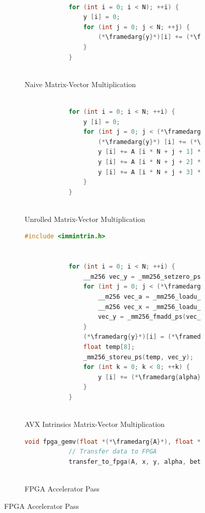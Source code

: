 \documentclass[manuscript,screen,review]{acmart}
\newcommand{\framedarg}[1]{
	\tikz[baseline=(char.base)]
	\node[draw=green, rectangle, inner sep=1.5pt, anchor=base] (char) {#1};
}
\begin{document}
	\begin{figure}[h]
	\centering
	\begin{subfigure}[t]{0.45\textwidth}
		\centering
		\caption{Naive Matrix-Vector Multiplication}
		\label{lst:naive}
		\begin{lstlisting}[language=C]
			
			for (int i = 0; i < N); ++i) {
				y [i] = 0;
				for (int j = 0; j < N; ++j) {
					(*\framedarg{y}*)[i] += (*\framedarg{A}*)[i * (*\framedarg{N}*) + j] * (*\framedarg{x}*)[j];
				}
			}
			
		\end{lstlisting}
	\end{subfigure}
	\hspace{1em}
	\begin{subfigure}[t]{0.45\textwidth}
		\centering
		\caption{Unrolled Matrix-Vector Multiplication}
		\label{lst:unrolled}
		\begin{lstlisting}[language=C]
			
			for (int i = 0; i < N; ++i) {
				y [i] = 0;
				for (int j = 0; j < (*\framedarg{N}*); j += 4) {
					(*\framedarg{y}*) [i] += (*\framedarg{A}*)[i * (*\framedarg{N}*) + j] * (*\framedarg{x}*)[j];
					y [i] += A [i * N + j + 1] * x [j + 1];
					y [i] += A [i * N + j + 2] * x [j + 2];
					y [i] += A [i * N + j + 3] * x [j + 3];
				}
			}
			
		\end{lstlisting}
	\end{subfigure}
	\vspace{1em}
	\begin{subfigure}[t]{0.45\textwidth}
		\centering
		\caption{AVX Intrinsics Matrix-Vector Multiplication}
		\label{lst:avx}
		\begin{lstlisting}[language=C++]
			#include <immintrin.h>
			
			
			for (int i = 0; i < N; ++i) {
				__m256 vec_y = _mm256_setzero_ps();
				for (int j = 0; j < (*\framedarg{N}*); j += 8) {
					__m256 vec_a = _mm256_loadu_ps(&(*\framedarg{A}*)[i * (*\framedarg{lda}*) + j]);
					__m256 vec_x = _mm256_loadu_ps(&(*\framedarg{x}*)[j]);
					vec_y = _mm256_fmadd_ps(vec_a, vec_x, vec_y);
				}
				(*\framedarg{y}*)[i] = (*\framedarg{beta}*) * y [i];
				float temp[8];
				_mm256_storeu_ps(temp, vec_y);
				for (int k = 0; k < 8; ++k) {
					y [i] += (*\framedarg{alpha}*) * temp[k];
				}
			}
			
		\end{lstlisting}
	\end{subfigure}
    \hspace{1em}
\begin{subfigure}[t]{0.45\textwidth}
	\centering
	\caption{FPGA Accelerator Pass}
	\label{lst:fpga}
	\begin{lstlisting}[language=C++]
		void fpga_gemv(float *(*\framedarg{A}*), float *(*\framedarg{x}*), float *(*\framedarg{y}*), float (*\framedarg{alpha}*), float (*\framedarg{beta}*), int (*\framedarg{lda}*), int (*\framedarg{N}*)) {
			// Transfer data to FPGA
			transfer_to_fpga(A, x, y, alpha, beta, lda, N);
			

\end{lstlisting}
\end{subfigure}
\end{figure}
\end{document}
